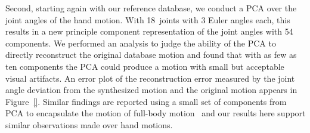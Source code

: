 Second, starting again with our reference database, we conduct a PCA over the joint angles of the hand motion. With 18~joints with 3 Euler angles each, this results in a new principle component representation of the joint angles with 54 components. We performed an analysis to judge the ability of the PCA to directly reconstruct the original database motion and found that with as few as ten components the PCA could produce a motion with small but acceptable visual artifacts. %
An error plot of the reconstruction error measured by the joint angle deviation from the synthesized motion and the original motion appears in Figure~\ref{}.  Similar findings are reported using a small set of components from PCA to encapsulate the motion of full-body motion~\cite{SafHodPol04} and our results here support similar observations made over hand motions.

\begin{figure}
  \centering
\end{figure}

